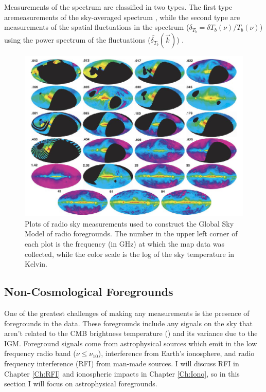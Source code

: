 Measurements of the \cm spectrum are classified in two types. The first type aremeasurements of the sky-averaged spectrum \avgdtb, while the second type are measurements of the spatial fluctuations in the \cm spectrum ($\delta_{T_b} =  \delta T_b (\nu)/ T_b (\nu)$) using the power spectrum of the fluctuations ($ \tilde{ \delta_{T_b} } ( \vec{k} )$) \cite{natarajan_2014}. 

\begin{figure}[htb]
\begin{center}
\includegraphics[width=0.95\linewidth]{Introduction/figures/GSM_maps.jpg}
\caption{Plots of radio sky measurements used to construct the Global Sky Model \cite{GSM_model} of radio foregrounds. The number in the upper left corner of each plot is the frequency (in GHz) at which the map data was collected, while the color scale is the log of the sky temperature in Kelvin.}
\label{Fig:GSM_maps}
\end{center}
\end{figure}

\subsection{Non-Cosmological Foregrounds}
One of the greatest challenges of making any \cm measurements is the presence of foregrounds in the data. These foregrounds include any signals on the sky that aren't related to the CMB brightness temperature (\tb) and its variance due to the IGM. Foreground signals come from astrophysical sources which emit in the low frequency radio band ($\nu \leq \nu_{10}$), interference from Earth's ionosphere, and radio frequency interference (RFI) from man-made sources. I will discuss RFI in Chapter \ref{Ch:RFI} and ionospheric impacts in Chapter \ref{Ch:Iono}, so in this section I will focus on astrophysical foregrounds. 

